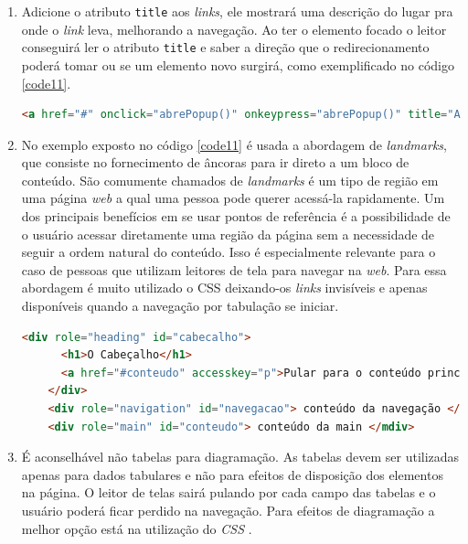 {{\begin{enumerate}
    \item Adicione o atributo \lstinline{title} aos \textit{links}, ele mostrará uma descrição do lugar pra onde o \textit{link} leva, melhorando a navegação. Ao ter o elemento focado o leitor conseguirá ler o atributo \lstinline{title} e saber a direção que o redirecionamento poderá tomar ou se um elemento novo surgirá, como exemplificado no código \ref{code11}.
    {\begin{lstlisting}[language=html,caption={Uso do atributo \textit{title} para dar uma explicação sobre onde o link leva}, label=code11]
    <a href="#" onclick="abrePopup()" onkeypress="abrePopup()" title="Abre uma janela pop-up com Javascript">Ver mais informações</a>
    \end{lstlisting}}
    
    \item No exemplo exposto no código \ref{code11} é usada a abordagem de \textit{landmarks}, que consiste no  fornecimento de âncoras para ir direto a um bloco de conteúdo. São comumente chamados de \textit{landmarks} é um tipo de região em uma página \textit{web} a qual uma pessoa pode querer acessá-la rapidamente. Um dos principais benefícios em se usar pontos de referência é a possibilidade de o usuário acessar diretamente uma região da página sem a necessidade de seguir a ordem natural do conteúdo. Isso é especialmente relevante para o caso de pessoas que utilizam leitores de tela para navegar na \textit{web}. Para essa abordagem é muito utilizado o CSS \cite{CSS} deixando-os \textit{links} invisíveis e apenas disponíveis quando a navegação por tabulação se iniciar.
    
    {\begin{lstlisting}[language=html,caption={Criação de \textit{landmarks} para acessar pontos de referências através do atalho p.}, label=code12]
    <div role="heading" id="cabecalho"> 
      <h1>O Cabeçalho</h1> 
      <a href="#conteudo" accesskey="p">Pular para o conteúdo principals</a> 
    </div> 
    <div role="navigation" id="navegacao"> conteúdo da navegação </div>
    <div role="main" id="conteudo"> conteúdo da main </mdiv>
    \end{lstlisting}}
    
    \item É aconselhável não tabelas para diagramação. As tabelas devem ser utilizadas apenas para dados tabulares e não para efeitos de disposição dos elementos na página. O leitor de telas sairá pulando por cada campo das tabelas e o usuário poderá ficar perdido na navegação. Para efeitos de diagramação a melhor opção está na utilização do \textit{CSS} \cite{CSS}.
    

\end{enumerate}}}
